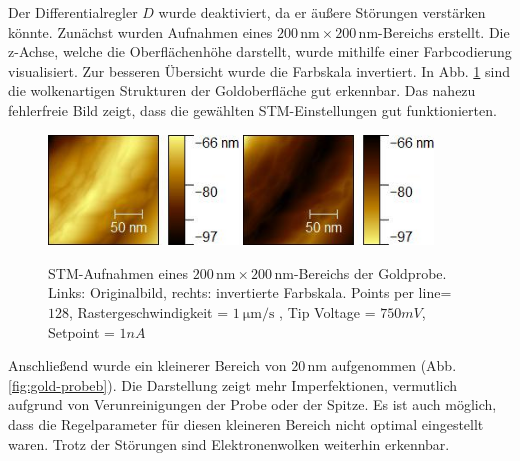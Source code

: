 \documentclass{article}
\begin{document}
Der Differentialregler $D$ wurde deaktiviert, da er äußere Störungen verstärken könnte. Zunächst wurden Aufnahmen eines $200 \, \text{nm} \times 200 \, \text{nm}$-Bereichs erstellt. Die z-Achse, welche die Oberflächenhöhe darstellt, wurde mithilfe einer Farbcodierung visualisiert. Zur besseren Übersicht wurde die Farbskala invertiert. In Abb. \ref{fig:gold-probe} sind die wolkenartigen Strukturen der Goldoberfläche gut erkennbar. Das nahezu fehlerfreie Bild zeigt, dass die gewählten STM-Einstellungen gut funktionierten.

\begin{figure}[h!]
    \centering
    \includegraphics[width=0.45\textwidth]{figure/Gold_mess_2.jpg}
    \hfill
    \includegraphics[width=0.45\textwidth]{figure/Gold_mess_inv.jpg}
    \caption{STM-Aufnahmen eines $200 \, \text{nm} \times 200 \, \text{nm}$-Bereichs der Goldprobe. Links: Originalbild, rechts: invertierte Farbskala. Points per line=$128$, Rastergeschwindigkeit = $ \SI{1}{\um \per \s}$ , Tip  Voltage = $750mV$, Setpoint = $1nA$}
    \label{fig:gold-probe}
\end{figure}
Anschließend wurde ein kleinerer Bereich von $20 \, \text{nm}$ aufgenommen (Abb. \ref{fig:gold-probeb}). Die Darstellung zeigt mehr Imperfektionen, vermutlich aufgrund von Verunreinigungen der Probe oder der Spitze. Es ist auch möglich, dass die Regelparameter für diesen kleineren Bereich nicht optimal eingestellt waren. Trotz der Störungen sind Elektronenwolken weiterhin erkennbar.
\end{document}
